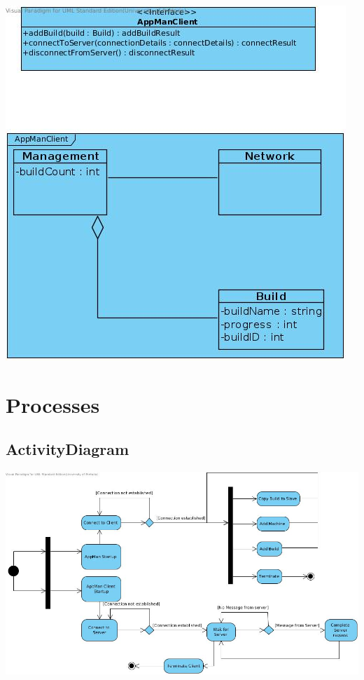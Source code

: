 \documentclass[a4paper,12pt,final]{article}
\begin{document}
\begin{center}
\includegraphics[scale=0.5]{AppManClientDiagram.jpg} 
\end{center}

\section{Processes}
\subsection{ActivityDiagram}
\begin{center}
\includegraphics[scale=0.37]{ActivityDiagram.jpg} 
\end{center}
\end{document}
